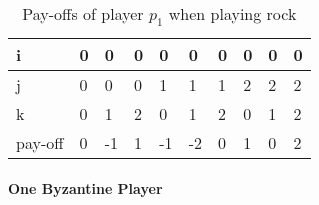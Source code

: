 
\begin{table}[]
	\centering
	\caption{Pay-offs of player $p_1$ when playing rock}\label{tab:1}
	\label{tab:rhh}
	\begin{tabular}{|l|l|l|l|l|l|l|l|l|l|}
		\hline
		i & 0 & 0 & 0 & 0 & 0 & 0 & 0 & 0 & 0\\
		\hline
		j & 0 & 0 & 0 & 1 & 1 & 1 & 2 & 2 & 2\\
		\hline
		k & 0 & 1 & 2 & 0 & 1 & 2 & 0 & 1 & 2\\
		\hline
		pay-off & 0 & -1 & 1 & -1 & -2 & 0 & 1 & 0 & 2\\
		\hline
	\end{tabular}
\end{table}




\paragraph{One Byzantine Player}

